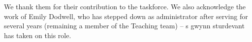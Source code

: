 We thank them for their contribution to the taskforce. We also
acknowledge the work of Emily Dodwell, who has stepped down as
administrator after serving for several years (remaining a member of the
Teaching team) -- s gwynn sturdevant has taken on this role.


\address{%
Heather Turner\\
University of Warwick\\%
UK\\
%
%
%
\href{mailto:Heather.Turner@R-Project.org}{\nolinkurl{Heather.Turner@R-Project.org}}%
}
